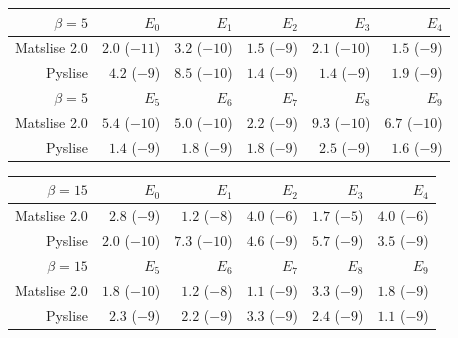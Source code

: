 \begin{table}

  \begin{center}
    \begin{tabular}{rrrrrr}
      \toprule
      $\beta=5$    & $E_{0}$       & $E_{1}$       & $E_{2}$      & $E_{3}$       & $E_{4}$       \\
      \midrule
      Matslise 2.0 & $2.0$ ($-11$) & $3.2$ ($-10$) & $1.5$ ($-9$) & $2.1$ ($-10$) & $1.5$ ($-9$)  \\
      Pyslise      & $4.2$ ($-9$)  & $8.5$ ($-10$) & $1.4$ ($-9$) & $1.4$ ($-9$)  & $1.9$ ($-9$)  \\
      \midrule
      \midrule
      $\beta=5$    & $E_{5}$       & $E_{6}$       & $E_{7}$      & $E_{8}$       & $E_{9}$       \\
      \midrule
      Matslise 2.0 & $5.4$ ($-10$) & $5.0$ ($-10$) & $2.2$ ($-9$) & $9.3$ ($-10$) & $6.7$ ($-10$) \\
      Pyslise      & $1.4$ ($-9$)  & $1.8$ ($-9$)  & $1.8$ ($-9$) & $2.5$ ($-9$)  & $1.6$ ($-9$)  \\
      \bottomrule
    \end{tabular}
  \end{center}

  \begin{center}
    \begin{tabular}{rrrrrr}
      \toprule
      $\beta=15$   & $E_{0}$       & $E_{1}$       & $E_{2}$      & $E_{3}$      & $E_{4}$      \\
      \midrule
      Matslise 2.0 & $2.8$ ($-9$)  & $1.2$ ($-8$)  & $4.0$ ($-6$) & $1.7$ ($-5$) & $4.0$ ($-6$) \\
      Pyslise      & $2.0$ ($-10$) & $7.3$ ($-10$) & $4.6$ ($-9$) & $5.7$ ($-9$) & $3.5$ ($-9$) \\
      \midrule
      \midrule
      $\beta=15$   & $E_{5}$       & $E_{6}$       & $E_{7}$      & $E_{8}$      & $E_{9}$      \\
      \midrule
      Matslise 2.0 & $1.8$ ($-10$) & $1.2$ ($-8$)  & $1.1$ ($-9$) & $3.3$ ($-9$) & $1.8$ ($-9$) \\
      Pyslise      & $2.3$ ($-9$)  & $2.2$ ($-9$)  & $3.3$ ($-9$) & $2.4$ ($-9$) & $1.1$ ($-9$) \\
      \bottomrule
    \end{tabular}
  \end{center}


\end{table}
